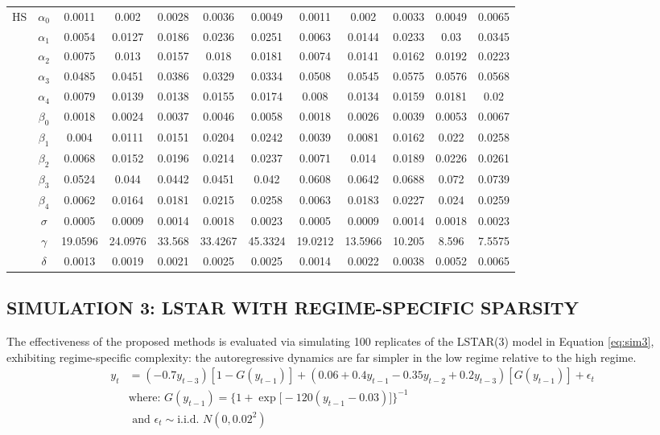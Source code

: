 \begin{table}
\begin{tabular}{cc|ccccc|ccccc}
    \midrule
    HS & $\alpha_0$ & 0.0011 & 0.002 & 0.0028 & 0.0036 & 0.0049 & 0.0011 & 0.002 & 0.0033 & 0.0049 & 0.0065 \\
    & $\alpha_1$ & 0.0054 & 0.0127 & 0.0186 & 0.0236 & 0.0251 & 0.0063 & 0.0144 & 0.0233 & 0.03 & 0.0345 \\
    & $\alpha_2$ & 0.0075 & 0.013 & 0.0157 & 0.018 & 0.0181 & 0.0074 & 0.0141 & 0.0162 & 0.0192 & 0.0223 \\
    & $\alpha_3$ & 0.0485 & 0.0451 & 0.0386 & 0.0329 & 0.0334 & 0.0508 & 0.0545 & 0.0575 & 0.0576 & 0.0568 \\
   & $\alpha_4$ & 0.0079 & 0.0139 & 0.0138 & 0.0155 & 0.0174 & 0.008 & 0.0134 & 0.0159 & 0.0181 & 0.02 \\
    & $\beta_0$ & 0.0018 & 0.0024 & 0.0037 & 0.0046 & 0.0058 & 0.0018 & 0.0026 & 0.0039 & 0.0053 & 0.0067 \\
    & $\beta_1$ & 0.004 & 0.0111 & 0.0151 & 0.0204 & 0.0242 & 0.0039 & 0.0081 & 0.0162 & 0.022 & 0.0258 \\
    & $\beta_2$ & 0.0068 & 0.0152 & 0.0196 & 0.0214 & 0.0237 & 0.0071 & 0.014 & 0.0189 & 0.0226 & 0.0261 \\
   & $\beta_3$ & 0.0524 & 0.044 & 0.0442 & 0.0451 & 0.042 & 0.0608 & 0.0642 & 0.0688 & 0.072 & 0.0739 \\
    & $\beta_4$ & 0.0062 & 0.0164 & 0.0181 & 0.0215 & 0.0258 & 0.0063 & 0.0183 & 0.0227 & 0.024 & 0.0259 \\
    & $\sigma$ & 0.0005 & 0.0009 & 0.0014 & 0.0018 & 0.0023 & 0.0005 & 0.0009 & 0.0014 & 0.0018 & 0.0023 \\
   & $\gamma$ & 19.0596 & 24.0976 & 33.568 & 33.4267 & 45.3324 & 19.0212 & 13.5966 & 10.205 & 8.596 & 7.5575 \\
   & $\delta$ & 0.0013 & 0.0019 & 0.0021 & 0.0025 & 0.0025 & 0.0014 & 0.0022 & 0.0038 & 0.0052 & 0.0065 \\
    \bottomrule
    \end{tabular}%
  \label{tab:changingsigma}%
\end{table}%


\subsection{SIMULATION 3: LSTAR WITH REGIME-SPECIFIC SPARSITY}

The effectiveness of the proposed methods is evaluated via simulating 100 replicates of the LSTAR(3) model in Equation \ref{eq:sim3}, exhibiting regime-specific complexity: the autoregressive dynamics are far simpler in the low regime relative to the high regime.
 \begin{equation}
	\begin{split}
		\label{eq:sim3}
		y_t&=(-0.7y_{t-3})[1-G(y_{t-1})] +(0.06+0.4y_{t-1}-0.35y_{t-2}+0.2y_{t-3})[G(y_{t-1})]+\epsilon_t\\
		& \textrm{where: } G(y_{t-1})=\bigg\{1+\exp\big[-120(y_{t-1}-0.03)\big]\bigg\}^{-1} \\
		&\textrm{ and }\epsilon_t \sim \textrm{i.i.d. }  N (0,0.02^2)\\
	\end{split}
\end{equation}

